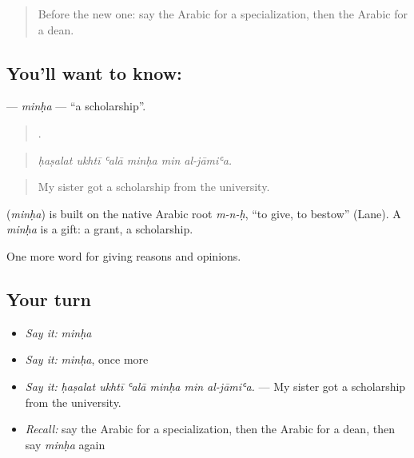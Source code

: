 \label{lesson:AR-C390-minha}



\begin{quote}
Before the new one: say the Arabic for a specialization, then the Arabic for a dean.
\end{quote}

\subsection*{You'll want to know: }
\textbf{} — \emph{minḥa} — \textquotedblleft{}a scholarship\textquotedblright{}.

\begin{quote}
     .
\end{quote}

\begin{quote}
\emph{ḥaṣalat ukhtī ʿalā minḥa min al-jāmiʿa.}
\end{quote}

\begin{quote}
My sister got a scholarship from the university.
\end{quote}

\begin{cousinweb}
\textbf{} (\emph{minḥa}) is built on the native Arabic root \emph{m-n-ḥ}, \textquotedblleft{}to give, to bestow\textquotedblright{} (Lane). A \emph{minḥa} is a gift: a grant, a scholarship.
\end{cousinweb}

\begin{grammarlens}[title={What you've built}]
One more word for giving reasons and opinions.
\end{grammarlens}

\subsection*{Your turn}
\begin{itemize}
\raggedright
  \item \emph{Say it:} \emph{minḥa}
  \item \emph{Say it:} \emph{minḥa}, once more
  \item \emph{Say it:} \emph{ḥaṣalat ukhtī ʿalā minḥa min al-jāmiʿa.} — My sister got a scholarship from the university.
  \item \emph{Recall:} say the Arabic for a specialization, then the Arabic for a dean, then say \emph{minḥa} again
\end{itemize}

